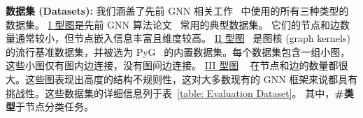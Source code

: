 \textbf{数据集 (Datasets): }
我们涵盖了先前 GNN 相关工作~\cite{wang2019dgl, pyG, ma2019neugraph} 中使用的所有三种类型的数据集。
\underline{I 型图}是先前 GNN 算法论文~\cite{GCNConv, GINConv, SageConv} 常用的典型数据集。
它们的节点和边数量通常较小，但节点嵌入信息丰富且维度较高。
\underline{II 型图}~\cite{KKMMN2016} 是图核 (graph kernels) 的流行基准数据集，并被选为 PyG~\cite{pyG} 的内置数据集。每个数据集包含一组小图，这些小图仅有图内边连接，没有图间边连接。
\underline{III 型图} ~\cite{snapnets, GCNConv} 在节点和边的数量都很大。这些图表现出高度的结构不规则性，这对大多数现有的 GNN 框架来说都具有挑战性。这些数据集的详细信息列于表~\ref{table: Evaluation Dataset}。
其中，\textbf{\#类型}于节点分类任务。
